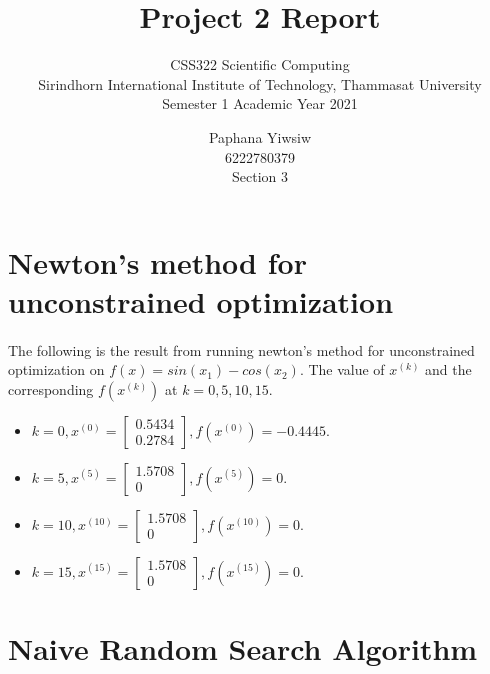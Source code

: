 \documentclass[a4paper]{article}
\title{Project 2 Report}
\subtitle{CSS322 Scientific Computing\\Sirindhorn International Institute of Technology, Thammasat University\\Semester 1 Academic Year 2021}
\author{Paphana Yiwsiw \\ 6222780379 \\ Section 3}
\begin{document}
\maketitle
\tableofcontents

\newpage 
\section{Newton’s method for unconstrained optimization}
\paragraph{}
The following is the result from running newton's method for unconstrained optimization on $f(x) = sin(x_1) - cos(x_2)$. The value of $x^{(k)}$ and the corresponding $f(x^{(k)})$ at $k = 0,5,10,15$.
\begin{itemize}
    \item $k = 0, x^{(0)} = \begin{bmatrix} 0.5434 \\ 0.2784 \end{bmatrix}, f(x^{(0)}) = -0.4445$.
    \item $k = 5, x^{(5)} = \begin{bmatrix} 1.5708 \\ 0 \end{bmatrix}, f(x^{(5)}) = 0$.
    \item $k = 10, x^{(10)} = \begin{bmatrix} 1.5708 \\ 0 \end{bmatrix}, f(x^{(10)}) = 0$.
    \item $k = 15, x^{(15)} = \begin{bmatrix} 1.5708 \\ 0 \end{bmatrix}, f(x^{(15)}) = 0$.
\end{itemize}

\section{Naive Random Search Algorithm}
\end{document}
